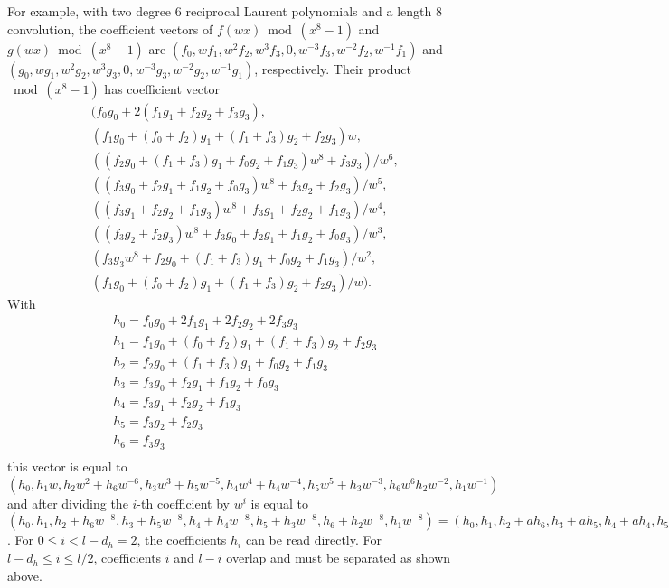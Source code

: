 \documentclass{article}
\begin{document}
For example, with two degree $6$ reciprocal Laurent polynomials and a length 
$8$ convolution, the coefficient vectors of $f(wx) \bmod{(x^8-1)}$ and 
$g(wx) \bmod{(x^8-1)}$ 
are $(f_0, w f_1, w^2 f_2, w^3 f_3, 0, w^{-3} f_3, w^{-2} f_2, w^{-1} f_1)$ 
and \\ 
$(g_0, w g_1, w^2 g_2, w^3 g_3, 0, w^{-3} g_3, w^{-2} g_2, w^{-1} g_1)$, 
respectively.
Their product $\bmod{(x^8-1)}$ has coefficient vector
\begin{eqnarray*}
&& (f_0 g_0 + 2(f_1 g_1 + f_2 g_2 + f_3 g_3), \\
&& (f_1 g_0 + (f_0 + f_2) g_1 + (f_1 + f_3) g_2 + f_2 g_3) w, \\
&& ((f_2 g_0 + (f_1 + f_3) g_1 + f_0 g_2 + f_1 g_3) w^8 + f_3 g_3)/w^6, \\
&& ((f_3 g_0 + f_2 g_1 + f_1 g_2 + f_0 g_3) w^8 + f_3 g_2 + f_2 g_3)/w^5, \\
&& ((f_3 g_1 + f_2 g_2 + f_1 g_3) w^8 + f_3 g_1 + f_2 g_2 + f_1 g_3)/w^4, \\
 && ((f_3 g_2 + f_2 g_3) w^8 + f_3 g_0 + f_2 g_1 + f_1 g_2 + f_0 g_3)/w^3, \\
&& (f_3 g_3 w^8 + f_2 g_0 + (f_1 + f_3) g_1 + f_0 g_2 + f_1 g_3)/w^2, \\
&& (f_1 g_0 + (f_0 + f_2) g_1 + (f_1 + f_3) g_2 + f_2 g_3)/w).
\end{eqnarray*}
With 
\begin{eqnarray*}
&& h_0 = f_0 g_0 + 2 f_1 g_1 + 2 f_2 g_2 + 2 f_3 g_3 \\
&& h_1 = f_1 g_0 + (f_0 + f_2) g_1 + (f_1 + f_3) g_2 + f_2 g_3 \\
&& h_2 = f_2 g_0 + (f_1 + f_3) g_1 + f_0 g_2 + f_1 g_3 \\
&& h_3 = f_3 g_0 + f_2 g_1 + f_1 g_2 + f_0 g_3 \\
&& h_4 = f_3 g_1 + f_2 g_2 + f_1 g_3 \\
&& h_5 = f_3 g_2 + f_2 g_3 \\
&& h_6 = f_3 g_3 \\
\end{eqnarray*}
this vector is equal to
$(h_0, h_1 w, h_2 w^2 + h_6 w^{-6}, h_3 w^3 + h_5 w^{-5}, h_4 w^4 + h_4 w^{-4},
  h_5 w^5 + h_3 w^{-3}, h_6 w^6 h_2 w^{-2}, h_1 w^{-1})$ 
and after dividing the $i$-th coefficient by $w^i$ is equal to
$(h_0, h_1, h_2 + h_6 w^{-8}, h_3 + h_5 w^{-8}, h_4 + h_4 w^{-8},
  h_5 + h_3 w^{-8}, h_6 + h_2 w^{-8}, h_1 w^{-8}) = (h_0, h_1, h_2 + a h_6, 
h_3 + a h_5, h_4 + a h_4, h_5 + a h_3, h_6 + a h_2, a h_1)$.
For $0 \leq i < l - d_h = 2$, the coefficients $h_i$ can be read directly. 
For $l - d_h \leq i \leq l/2$, coefficients $i$ and $l-i$ overlap and must
be separated as shown above.
\end{document}

